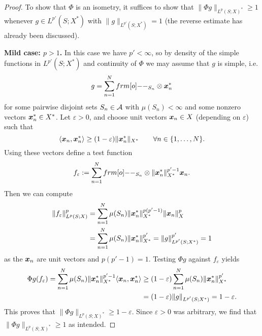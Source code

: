 \begin{proof}
  To show that $\Phi$ is an isometry, it suffices to show that $\|\Phi g\|_{L^p(S;X)^*} \geq 1$ whenever $g \in L^{p'}(S;X^*)$ with $\|g\|_{L^{p'}(S;X^*)} = 1$ (the reverse estimate has already been discussed).
  
  \textbf{Mild case: $p > 1$.}
  In this case we have $p' < \infty$, so by density of the simple functions in $L^{p'}(S;X^*)$ and continuity of $\Phi$ we may assume that $g$ is simple, i.e.
  \begin{equation*}
    g = \sum_{n=1}^N \1_{S_n} \otimes \mb{x}_n^*
  \end{equation*}
  for some pairwise disjoint sets $S_n \in \mathcal{A}$ with $\mu(S_n) < \infty$ and some nonzero vectors $\bm{x}_n^* \in X^*$.
  Let $\varepsilon > 0$, and choose unit vectors $\bm{x}_n \in X$ (depending on $\varepsilon$) such that
  \begin{equation*}
    \langle \bm{x}_n, \bm{x}_n^* \rangle \geq (1-\varepsilon)\|\bm{x}_n^*\|_{X^*} \qquad \forall n \in \{1,\ldots,N\}.
  \end{equation*}
  Using these vectors define a test function
  \begin{equation*}
    f_\varepsilon := \sum_{n=1}^N \1_{S_n} \otimes \|\mb{x}_n^*\|_{X^*}^{p' - 1} \mb{x}_n.
  \end{equation*}
  Then we can compute
  \begin{equation*}
    \begin{aligned}
      \|f_\varepsilon\|_{L^p(S;X)}^p &= \sum_{n=1}^N \mu(S_n) \|\bm{x}_n^*\|_{X^*}^{p(p' - 1)} \|\bm{x}_n\|_{X}^p \\
      &= \sum_{n=1}^N \mu(S_n) \|\bm{x}_n^*\|_{X^*}^{p'}
      = \|g\|_{L^{p'}(S;X^*)}^{p'} = 1
    \end{aligned}
  \end{equation*}
  as the $\bm{x}_n$ are unit vectors and $p(p' - 1) = 1$.
  Testing $\Phi g$ against $f_{\varepsilon}$ yields
  \begin{equation*}
    \begin{aligned}
      \Phi g(f_\varepsilon) = \sum_{n=1}^N \mu(S_n) \|\bm{x}_n^*\|_{X^*}^{p' - 1} \langle \bm{x}_n, \bm{x}_n^* \rangle
      &\geq (1-\varepsilon) \sum_{n=1}^N \mu(S_n) \|\bm{x}_n^*\|_{X^*}^{p'} \\
      &= (1-\varepsilon) \|g\|_{L^{p'}(S;X^*)} = 1-\varepsilon.
    \end{aligned}
  \end{equation*}
  This proves that $\|\Phi g\|_{L^p(S;X)^*} \geq 1-\varepsilon$.
  Since $\varepsilon > 0$ was arbitrary, we find that $\|\Phi g\|_{L^p(S;X)^*} \geq 1$ as intended.


\end{proof}
